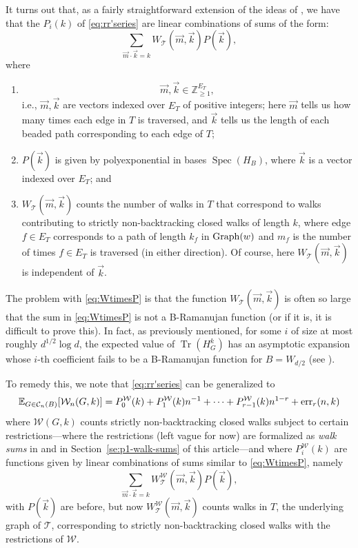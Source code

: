 \documentclass{memo-l}
\theoremstyle{plain}
\theoremstyle{definition}
\numberwithin{section}{chapter}
\numberwithin{equation}{chapter}
\newcommand{\cal}{\mathcal}
\DeclareMathOperator{\Tr}{Tr}
\DeclareMathOperator{\Spec}{Spec}
\theoremstyle{plain}
\theoremstyle{definition}
\newcommand\EE{\mathbb{E}}
\newcommand\ZZ{\mathbb{Z}}
\newcommand\cC{\mathcal{C}}
\newcommand\cT{\mathcal{T}}
\newcommand\cW{\mathcal{W}}
\begin{document}
It turns out that, as a fairly straightforward extension of the ideas of
\cite{friedman_random_graphs}, we have that the \( P_i(k) \) 
of \eqref{eq:rr'series}
are linear
combinations of sums of the form: \begin{equation}\label{eq:WtimesP}
\sum_{\vec m\cdot \vec k = k} W_{\cal T}(\vec m,\vec k) P(\vec k),
\end{equation} where \begin{enumerate}[label= (\arabic*)] \item \[ \vec m,
\vec k \in \ZZ_{\geq 1}^{E_T}, \] i.e., \( \vec m,\vec k \) are vectors
indexed over \( E_T \) of positive integers; 
here $\vec m$ tells us how many times each edge in $T$ is traversed, and
$\vec k$ tells us the length of each beaded path corresponding to each
edge of $T$;
\item \( P(\vec k) \) is given by
polyexponential in bases \( \Spec(H_B) \), where \( \vec k \) is a vector
indexed over \( E_T \); and \item \( W_{\cal T}(\vec m,\vec k) \) counts
the number of walks in \( T \) that correspond to walks contributing to
strictly non-backtracking closed walks of length \( k \), where edge \(
f\in E_T \) corresponds to a path of length \( k_f \) in \( {\rm Graph}(w)
\) and \( m_f \) is the number of times \( f\in E_T \) is traversed (in
either direction).  
Of course, here
\( W_{\cal T}(\vec m,\vec k) \) is independent
of \( \vec k \).  
\end{enumerate}

The problem with \eqref{eq:WtimesP} is that the function \( W_{\cal T}(\vec
m,\vec k) \) is often so large that the sum in \eqref{eq:WtimesP}
is not a
\gls{B-Ramanujan function}
(or if it is, it is difficult to prove this).
In fact, as previously mentioned,
for some $i$ of size at most roughly $d^{1/2}\log d$,
the expected value of $\Tr(H_G^k)$ has
an asymptotic expansion whose $i$-th coefficient fails to
be a
\gls{B-Ramanujan function}
for $B=W_{d/2}$ (see \cite{friedman_alon}).

To remedy this, we note that \eqref{eq:rr'series} can be generalized to
\begin{equation}\label{eq:cWseries} \EE_{G \in \cC_n(B)}[ \cW_n(G,k) ] =
P^\cW_0(k) + P^\cW_1(k) n^{-1} + \cdots + P^\cW_{r-1}(k) n^{1-r} + {\rm
err}_r(n,k) \end{equation} where \( \cW(G,k) \) counts strictly
non-backtracking closed walks subject to certain restrictions---where
the restrictions (left vague for now)
are formalized as 
\emph{\glspl{walk sum}} 
in \cite{friedman_alon} and in Section~\ref{se:p1-walk-sums} of
this article---and where \( P^\cW_i(k) \) are functions given by linear
combinations of sums similar to \eqref{eq:WtimesP}, namely
\begin{equation}\label{eq:WWtimesP} 
\sum_{\vec m\cdot \vec k = k}
W^\cW_\cT(\vec m,\vec k) P(\vec k), 
\end{equation} with \( P(\vec k) \) are
before, but now \( W^\cW_\cT(\vec m,\vec k) \) counts walks in \( T \), the
underlying graph of \( \cT \), corresponding to strictly non-backtracking
closed walks with the restrictions of \( \cW \).
\end{document}
